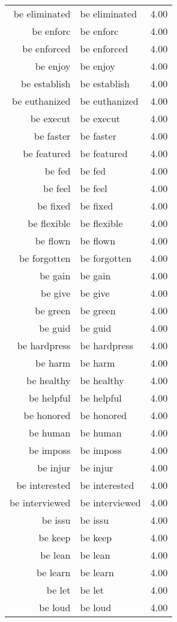 \begin{table}[ht]
\begin{tabular}{rlr}
  be eliminated & be eliminated & 4.00 \\ 
  be enforc & be enforc & 4.00 \\ 
  be enforced & be enforced & 4.00 \\ 
  be enjoy & be enjoy & 4.00 \\ 
  be establish & be establish & 4.00 \\ 
  be euthanized & be euthanized & 4.00 \\ 
  be execut & be execut & 4.00 \\ 
  be faster & be faster & 4.00 \\ 
  be featured & be featured & 4.00 \\ 
  be fed & be fed & 4.00 \\ 
  be feel & be feel & 4.00 \\ 
  be fixed & be fixed & 4.00 \\ 
  be flexible & be flexible & 4.00 \\ 
  be flown & be flown & 4.00 \\ 
  be forgotten & be forgotten & 4.00 \\ 
  be gain & be gain & 4.00 \\ 
  be give & be give & 4.00 \\ 
  be green & be green & 4.00 \\ 
  be guid & be guid & 4.00 \\ 
  be hardpress & be hardpress & 4.00 \\ 
  be harm & be harm & 4.00 \\ 
  be healthy & be healthy & 4.00 \\ 
  be helpful & be helpful & 4.00 \\ 
  be honored & be honored & 4.00 \\ 
  be human & be human & 4.00 \\ 
  be imposs & be imposs & 4.00 \\ 
  be injur & be injur & 4.00 \\ 
  be interested & be interested & 4.00 \\ 
  be interviewed & be interviewed & 4.00 \\ 
  be issu & be issu & 4.00 \\ 
  be keep & be keep & 4.00 \\ 
  be lean & be lean & 4.00 \\ 
  be learn & be learn & 4.00 \\ 
  be let & be let & 4.00 \\ 
  be loud & be loud & 4.00 \\ 

\end{tabular}
\end{table}
